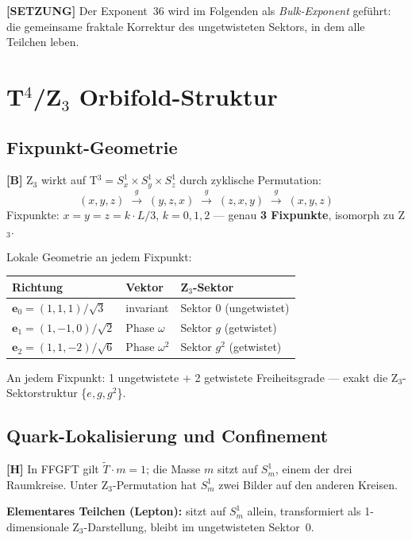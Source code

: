 \textbf{[SETZUNG]} Der Exponent~36 wird im Folgenden als
\emph{Bulk-Exponent} geführt: die gemeinsame fraktale Korrektur des
ungetwisteten Sektors, in dem alle Teilchen leben.

\section{T$^4$/Z$_3$ Orbifold-Struktur}

\subsection{Fixpunkt-Geometrie}

\textbf{[B]} Z$_3$ wirkt auf T$^3 = S^1_x \times S^1_y \times S^1_z$
durch zyklische Permutation:
\[
  (x,y,z) \;\xrightarrow{g}\; (y,z,x) \;\xrightarrow{g}\; (z,x,y)
  \;\xrightarrow{g}\; (x,y,z)
\]
Fixpunkte: $x = y = z = k\cdot L/3$, $k = 0,1,2$ --- genau
\textbf{3 Fixpunkte}, isomorph zu Z$_3$.

Lokale Geometrie an jedem Fixpunkt:
\begin{center}
\renewcommand{\arraystretch}{1.3}
{\small\begin{tabular}{lll}
\toprule
Richtung & Vektor & Z$_3$-Sektor \\
\midrule
$\mathbf{e}_0 = (1,1,1)/\sqrt{3}$   & invariant   & Sektor 0 (ungetwistet) \\
$\mathbf{e}_1 = (1,-1,0)/\sqrt{2}$  & Phase $\omega$   & Sektor $g$ (getwistet) \\
$\mathbf{e}_2 = (1,1,-2)/\sqrt{6}$  & Phase $\omega^2$ & Sektor $g^2$ (getwistet) \\
\bottomrule
\end{tabular}}
\renewcommand{\arraystretch}{1.0}
\end{center}
An jedem Fixpunkt: 1 ungetwistete $+$ 2 getwistete Freiheitsgrade ---
exakt die Z$_3$-Sektorstruktur \{$e, g, g^2$\}.

\subsection{Quark-Lokalisierung und Confinement}

\textbf{[H]} In FFGFT gilt $\tilde{T}\cdot m = 1$; die Masse $m$ sitzt
auf $S^1_m$, einem der drei Raumkreise. Unter Z$_3$-Permutation hat
$S^1_m$ zwei Bilder auf den anderen Kreisen.

\textbf{Elementares Teilchen (Lepton):} sitzt auf $S^1_m$ allein,
transformiert als 1-dimensionale Z$_3$-Darstellung,
bleibt im ungetwisteten Sektor~0.


